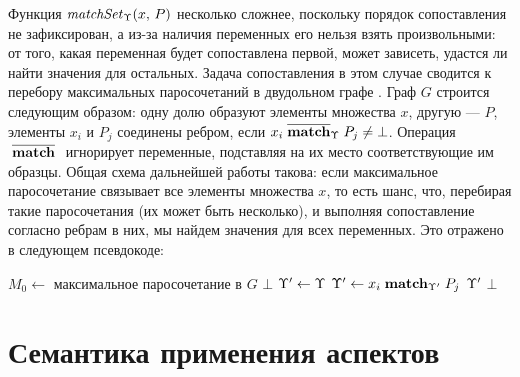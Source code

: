 Функция $\matchSet{\ME}{x}{P}$ несколько сложнее, поскольку порядок сопоставления не зафиксирован, а из-за наличия переменных его нельзя взять произвольными: от того, какая переменная будет сопоставлена первой, может зависеть, удастся ли найти значения для остальных. Задача сопоставления в этом случае сводится к перебору максимальных паросочетаний в двудольном графе \cite{Cormen}. Граф $G$ строится следующим образом: одну долю образуют элементы множества $x$, другую --- $P$, элементы $x_i$ и $P_j$ соединены ребром, если $\matchNV[\ME]{x_i}{P_j} \neq \bot$. Операция $\matchNV{}{}$ игнорирует переменные, подставляя на их место соответствующие им образцы. Общая схема дальнейшей работы такова: если максимальное паросочетание связывает все элементы множества $x$, то есть шанс, что, перебирая такие паросочетания (их может быть несколько), и выполняя сопоставление согласно ребрам в них, мы найдем значения для всех переменных. Это отражено в следующем псевдокоде:
%
\newcommand{\matchM}[2]{\mathsf{matchM}(#1,\, #2)}%
%
\begin{algorithmic}
\STATE $M_0 \gets$ максимальное паросочетание в $G$
	\RETURN $\bot$
\ENDIF
{}
	\STATE{}
	\STATE $\ME' \gets \ME$
	\STATE{}
		\STATE $\ME' \gets \match[\ME']{x_i}{P_j}$
	\ENDFOR
		\RETURN $\ME'$ 
	\ENDIF
\ENDFOR
\RETURN $\bot$
\end{algorithmic}

\section{Семантика применения аспектов}

